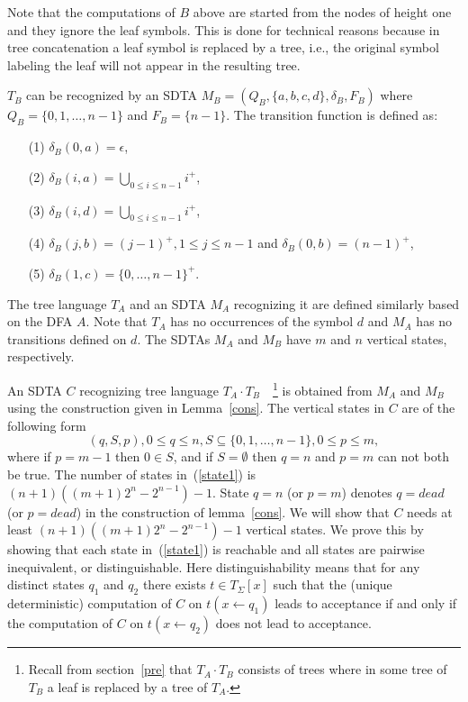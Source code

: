 \documentclass[copyright]{eptcs}
\begin{document}
Note that the computations of $B$ above are started from the nodes
of height one and they ignore the leaf symbols. This is done for
technical reasons because in tree concatenation a leaf symbol is
replaced by a tree, i.e., the original symbol labeling the leaf
will not appear in the resulting tree.

$T_B$ can be recognized by an SDTA $M_B=(Q_B,\{a,b,c,d\},
\delta_B, F_B)$ where $Q_B=\{0,1,\ldots,n-1\}$ and $F_B=\{n-1\}$.
The transition function is defined as:
\begin{itemize}
  \item[(1)] $\delta_B(0,a)=\epsilon$,
  \item[(2)] $\delta_B(i,a)=\bigcup_{0 \leq i \leq n-1} i^+$,
  \item[(3)] $\delta_B(i,d)=\bigcup_{0 \leq i \leq n-1} i^+$,
  \item[(4)] $\delta_B(j, b) = (j-1)^+, 1 \leq j \leq n-1$ and
  $\delta_B(0, b) = (n-1)^+$,
  \item[(5)] $\delta_B(1,c)=\{0, \ldots, n-1\}^+$.
\end{itemize}

The tree language $T_A$ and an SDTA $M_A$ recognizing it are
defined similarly based on the DFA $A$. Note that $T_A$ has no
occurrences of the symbol $d$ and $M_A$ has no transitions defined
on $d$.
The SDTAs $M_A$ and $M_B$ have $m$ and $n$
vertical states, respectively.

An SDTA $C$ recognizing tree language $T_A \cdot T_B$\ \
\footnote{Recall from section~\ref{pre} that $T_A \cdot T_B$
consists of trees where in some tree of $T_B$ a leaf is replaced
by a tree of $T_A$.} is obtained from $M_A$ and $M_B$ using the
construction given in Lemma~\ref{cons}. The vertical states in $C$
are of the following form
\begin{equation}\label{state1}
(q,S,p), 0\leq q\leq n, S\subseteq \{0,1,\ldots,n-1\}, 0\leq p\leq
m,
\end{equation} where if $p=m-1$ then $0\in S$, and if $S=\emptyset$
then $q=n$ and $p=m$ can not both be true. The number of states
in~(\ref{state1}) is $(n+1) ((m+1)2^n-2^{n-1})-1$. State $q=n$ (or
$p=m$) denotes $q=dead$ (or $p=dead$) in the construction of
lemma~\ref{cons}. We will show that $C$ needs at least $(n+1)
((m+1)2^n-2^{n-1})-1$ vertical states. We prove this by showing
that each state in~(\ref{state1}) is reachable and all states are
pairwise inequivalent, or distinguishable. Here distinguishability
means that for any distinct states $q_1$ and $q_2$ there exists $t
\in T_\Sigma[x]$ such that the (unique deterministic) computation
of $C$ on $t(x \leftarrow q_1)$ leads to acceptance if and only if
the computation of $C$ on $t(x \leftarrow q_2)$ does not lead to
acceptance.
\end{document}

